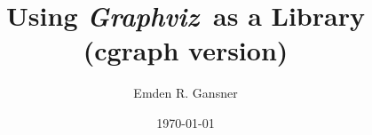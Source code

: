 \documentclass[11pt]{article}
\date{\today}
\def\gviz{{\it Graphviz}}
\begin{document}

\author{Emden R. Gansner}
\title{Using \gviz\ as a Library \\
(cgraph version)}
\maketitle

\newpage
\tableofcontents
\newpage







%
%

\clearpage


\appendix
\clearpage



\end{document}
